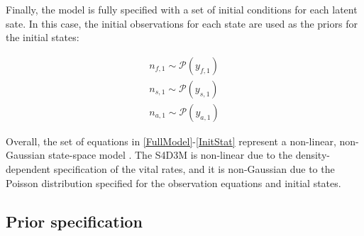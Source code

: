 \documentclass[12pt,a4paper]{article}
\begin{document}
Finally, the model is fully specified with a set of initial conditions for each latent sate. In this case, the initial observations for each state are used as the priors for the initial states:

\begin{equation}\label{InitStat}
	\begin{array}
		{l}{n_{f, 1} \sim \mathcal{P}(y_{f, 1})} \\
		{n_{s, 1} \sim \mathcal{P}(y_{s, 1})} \\
		{n_{a, 1} \sim \mathcal{P}(y_{a, 1})}
	\end{array}
\end{equation}

Overall, the set of equations in \ref{FullModel}-\ref{InitStat} represent a non-linear, non-Gaussian state-space model \cite{Durbin2001}. The S4D3M is non-linear due to the density-dependent specification of the vital rates, and it is non-Gaussian due to the Poisson distribution specified for the observation equations and initial states.\\

\subsection{Prior specification}
\end{document}
